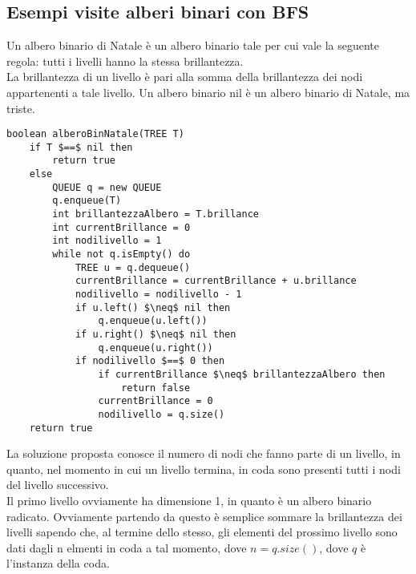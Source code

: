 \documentclass[../cheatSheetAlgoritmi.tex]{subfiles}
\begin{document}
\subsection{Esempi visite alberi binari con BFS}
Un albero binario di Natale è un albero binario tale per cui vale la seguente regola: tutti i livelli hanno la stessa brillantezza.  \\La brillantezza di un livello è pari alla somma della brillantezza dei nodi appartenenti a tale livello.  Un albero binario nil è un albero binario di Natale, ma triste.
\begin{lstlisting}[caption=Esempi BFS alberi binari]
boolean alberoBinNatale(TREE T)
	if T $==$ nil then
		return true
	else
		QUEUE q = new QUEUE
		q.enqueue(T)
		int brillantezzaAlbero = T.brillance
		int currentBrillance = 0
		int nodilivello = 1
		while not q.isEmpty() do
			TREE u = q.dequeue()
			currentBrillance = currentBrillance + u.brillance
			nodilivello = nodilivello - 1
			if u.left() $\neq$ nil then
				q.enqueue(u.left())
			if u.right() $\neq$ nil then
				q.enqueue(u.right())
			if nodilivello $==$ 0 then
				if currentBrillance $\neq$ brillantezzaAlbero then
					return false
				currentBrillance = 0
				nodilivello = q.size()
	return true
\end{lstlisting}
\newpage
\begin{flushleft}
La soluzione proposta conosce il numero di nodi che fanno parte di un livello, in quanto, nel momento in cui un livello termina, in coda sono presenti tutti i nodi del livello successivo. \\
Il primo livello ovviamente ha dimensione 1, in quanto è un albero binario radicato. Ovviamente partendo da questo è semplice sommare la brillantezza dei livelli sapendo che, al termine dello stesso, gli elementi del prossimo livello sono dati dagli n elmenti in coda a tal momento, dove $n = q.size()$, dove $q$ è l'instanza della coda.
\end{flushleft}
\end{document}
